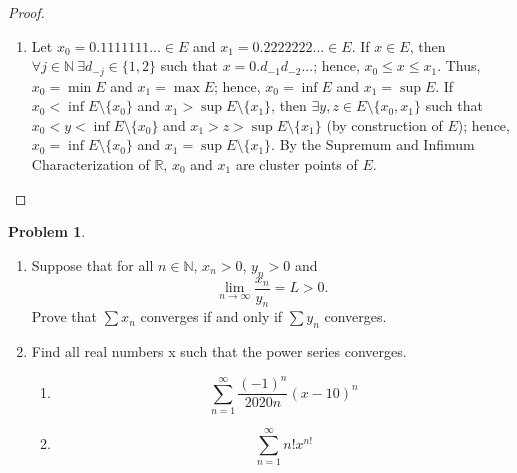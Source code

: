\documentclass[12pt]{article}
\theoremstyle{definition}
\newtheorem{problem}{Problem}
\begin{document}
\begin{proof}
\begin{enumerate}[label=(\alph*)]
\begin{enumerate}[label=(\roman*)]
\begin{align*}
            &= \lim_{j \to \infty}x_{n_{m_j}} + \liminf_{n \to \infty}y_n \leq \limsup_{n \to \infty}x_n + \limsup_{n \to \infty}y_n.
        \end{align*}
        \end{enumerate}
        \item Let \(x_0 = 0.1111111... \in E\) and \(x_1 = 0.2222222... \in E\). If \(x \in E\), then \(\forall j \in \mathbb{N} \ \exists d_{-j} \in \{1,2\}\) such that \(x = 0.d_{-1}d_{-2}...\); hence, \(x_0 \leq x \leq x_1\). Thus, \(x_0 = \min E\) and \(x_1 = \max E\); hence, \(x_0 = \inf E\) and \(x_1 = \sup E\). If \(x_0 < \inf E \setminus \{x_0\}\) and \(x_1 > \sup E \setminus \{x_1\}\), then \(\exists y,z \in E \setminus \{x_0,x_1\}\) such that \(x_0 < y < \inf E \setminus \{x_0\}\) and \(x_1 > z > \sup E \setminus \{x_1\}\) (by construction of \(E\)); hence, \(x_0 = \inf E \setminus \{x_0\}\) and \(x_1 = \sup E \setminus \{x_1\}\). By the Supremum and Infimum Characterization of \(\mathbb{R}\), \(x_0\) and \(x_1\) are cluster points of \(E\).
    \end{enumerate}
\end{proof}

\begin{problem}
    \hfill
    \begin{enumerate}[label=(\alph*)]
        \item Suppose that for all \(n \in \mathbb{N}\), \(x_n > 0\), \(y_n > 0\) and
        \[
            \lim_{n \to \infty}\frac{x_n}{y_n} = L > 0.
        \]
        Prove that \(\sum x_n\) converges if and only if \(\sum y_n\) converges.
        \item Find all real numbers x such that the power series converges.
        \begin{enumerate}[label=(\roman*)]
            \item \[
                \sum_{n = 1}^{\infty}\frac{(-1)^n}{2020n}(x - 10)^n
            \]
            \item \[
                \sum_{n = 1}^{\infty}n!x^{n!}
            \]
        \end{enumerate}
    \end{enumerate}
\end{problem}
\end{document}
